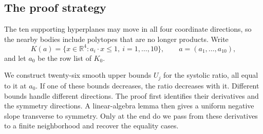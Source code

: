 \subsection{The proof strategy}
The ten supporting hyperplanes may move in all four coordinate directions,
so the nearby bodies include polytopes that are no longer products.
Write
\[
 K(a)=\{x\in\mathbb R^4:a_i\cdot x\leq1,\ i=1,\ldots,10\},
 \qquad a=(a_1,\ldots,a_{10}),
\]
and let $a_0$ be the row list of $K_0$.

We construct twenty-six smooth upper bounds $U_j$ for the systolic ratio,
all equal to it at $a_0$. If one of these bounds decreases, the ratio
decreases with it. Different bounds handle different directions.
The proof first identifies their derivatives and the symmetry directions.
A linear-algebra lemma then gives a uniform negative slope transverse to
symmetry. Only at the end do we pass from these derivatives to a finite
neighborhood and recover the equality cases.


